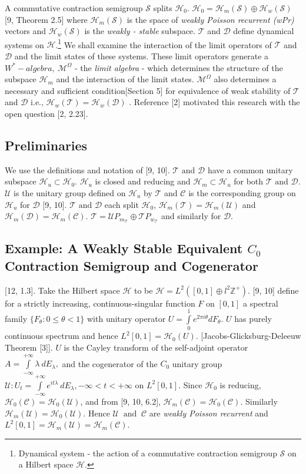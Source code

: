\documentclass[req no]{amsart}[16pt]
\theoremstyle{plain}
\theoremstyle{definition}
\numberwithin{equation}{section}\setcounter{page}{1}
\def\m{\mbox}
\def\D{\displaystyle}
\def\ma{\m{ and }}
\def\O{\Omega}
\def\D{\mathcal{D}}
\def\h{\mathcal{H}}
\def\T {\mathcal{T}}
\def\M {\mathcal{M}}
\def\s{\mathcal{S}}
\def\C{\mathcal{C}}
\def\U{\mathcal{U}}
\begin{document}
A commutative contraction semigroup $\s$ splits $\h_{0}$.  $\h_{0}= \h_{m}(\s) \oplus \h_w(\s)$ [9, Theorem 2.5] where $\h_{m}(\s)$ is the space of \emph{weakly Poisson recurrent (wPr)} vectors and $\h_{w}(\s)$ is the \emph{weakly - stable} subspace. $\T$ and $\D$ define dynamical systems on $\h$.\footnote{Dynamical system - the action of a commutative contraction semigroup $\s$ on a Hilbert space $\h$.} We shall examine the interaction of the limit operators of $\T$ and $\D$  and the limit states of these systems. These limit operators generate a $W^{*} - algebra, ~\M^{\O}$ - the \emph{limit algebra} - which determines the structure of the subspace $\h_{m}$ and the interaction of the limit states. $\M^{\O}$ also determines a necessary and sufficient condition[Section 5] for equivalence of weak stability of $\mathcal{T}$ and $\D$ i.e., $\h_w(\T)= \h_w(\D)$ . Reference [2] motivated this research with the open question [2, 2.23].


\subsection{Preliminaries} We use the definitions and notation of [9, 10]. $\T \ma \mathcal{D}$ have a common unitary subspace $\h_{u}\subset \h_{0} $. $\h_{u}$ is closed and reducing and $ \h_{m} \subset \h_{u}$ for both $\T \ma \mathcal{D}$. $\U$ is the unitary group defined on $\h_{u}$ by $\T$ and $\C$  is the corresponding group on $\h_{u}$ for $\mathcal{D}$ [9, 10]. $\T \ma \mathcal{D}$ each split $\h_{0}$,  $\h_{m}(\T)=\h_{m}(\U)$ and $\h_{m}(\D)=\h_{m}(\C)$. $\T = \U P_{m_{\T}}\oplus \T P_{w_{\T}}$ and similarly for $\D$.


\subsection{Example: A Weakly Stable Equivalent $C_{0}$ Contraction Semigroup and Cogenerator} [12, 1.3].
Take the Hilbert space $\h$ to be $\h = L^{2}([0, 1] \oplus  l^{2}{\mathbb{Z}}^{+})$. [9, 10] define for a strictly increasing, continuous-singular function $F$ on $[0, 1]$ a spectral family $\{F_\theta:0\leq\theta< 1\}$ with unitary operator $U = \int\limits^{1}_{0} e^{2 \pi i \theta}dF_\theta$.  $U$ has purely continuous spectrum and hence $L^{2}[0, 1] = \h_{0}(U)$. [Jacobs-Glicksburg-Deleeuw Theorem [3]]. $U$ is the Cayley transform of the self-adjoint operator $A = \int\limits^{+\infty}_{-\infty} \lambda ~dE_\lambda, $ and the cogenerator of the $C_{0}$ unitary group $\U : U_{t}= \int\limits^{+\infty}_{-\infty} e^{i t \lambda} ~dE_\lambda, -\infty < t < + \infty$ on $L^{2}[0, 1]$. Since $\h_{0}$ is reducing, $ \h_{0}(\C) = \h_{0}(\U)$, and from [9, 10, 6.2], $\h_{m}(\C)= \h_{0}(\C)$. Similarly $\h_{m}(\U)= \h_{0}(\U)$. Hence $\U ~\ma~\C$ are \emph{weakly Poisson recurrent} and $L^{2}[0, 1] = \h_{m}(\U)=\h_{m}(\C)$.
\end{document}
